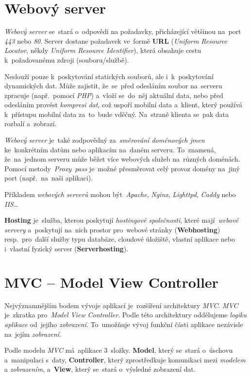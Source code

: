 \documentclass[11pt,a4paper]{report}
\begin{document}
        \section{Webový server}
            \emph{Webový server} se~stará o~odpovědi na požadavky, přicházející většinou na~port \emph{443} nebo \emph{80}. Server dostane požadavek ve~formě \textbf{URL} (\emph{Uniform Resource Locator}, někdy \emph{Uniform Resource Identifier}), která obsahuje cestu k~požadovanému zdroji (souboru/službě).

            Neslouží pouze k~poskytování statických souborů, ale i~k~poskytování dynamických dat. Může zajistit, že~se~před odesláním soubor na~serveru zpracuje (např.~pomocí \emph{PHP}) a~vloží se~do~něj aktuální data, nebo před odesláním provést \emph{kompresi dat}, což uspoří mobilní data a~klient, který používá k~přístupu mobilní data za~to~bude vděčný. Na~straně klienta se~pak data rozbalí a~zobrazí.

            \emph{Webový server} je~také zodpovědný za~\emph{směrování doménových jmen} ke~konkrétním datům nebo aplikacím na~daném serveru. To~znamená, že~na~jednom serveru může běžet více webových služeb na~různých doménách. Pomocí metody~\emph{Proxy~pass} je~možné přesměrovat celý provoz domény na~jiný port (např.~na~naši aplikaci). \cite{webserver:mdn}

            Příkladem \emph{webových serverů} mohou být~\emph{Apache}, \emph{Nginx}, \emph{Lighttpd}, \emph{Caddy} nebo \emph{IIS}\dots

            \textbf{Hosting} je~služba, kterou poskytují \emph{hostingové společnosti}, které mají~\emph{webové servery} a~poskytují na~nich prostor pro~webové stránky (\textbf{Webhosting}) resp.~pro~další služby typu databáze, cloudové úložiště, vlastní aplikace nebo i~vlastní fyzický server (\textbf{Serverhosting}). \cite{dockernginxperformance}
        
        \section{MVC -- Model View Controller}
            Nejvýznamnějším bodem vývoje aplikací je~rozšíření architektury \emph{MVC}. \emph{MVC} je~zkratka pro~\emph{Model View Controller}. Podle této architektury oddělujeme \emph{logiku aplikace} od~jejího \emph{zobrazení}. To~umožňuje vývoj funkční části aplikace nezávisle na~jejím \emph{zobrazení}.

            Podle modelu \emph{MVC} má~aplikace 3~složky. \textbf{Model}, který se~stará o~úschovu a~manipulaci s~daty, \textbf{Controller}, který zprostředkuje komunikaci mezi \emph{modelem} a \emph{zobrazením}, a~\textbf{View}, který se~stará o~výsledné zobrazení dat. \cite{MVC}
            
\end{document}
